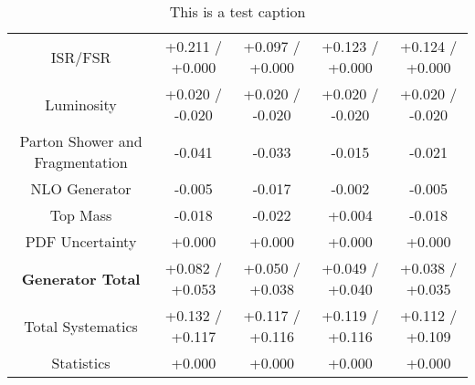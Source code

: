 \begin{table}[htbp]
\begin{center}
\begin{tabular}{|c|c|c|c|c|}
ISR/FSR                               &+0.211   / +0.000   & +0.097   / +0.000   & +0.123   / +0.000   & +0.124   / +0.000  \\
Luminosity                            &+0.020   / -0.020   & +0.020   / -0.020   & +0.020   / -0.020   & +0.020   / -0.020  \\
Parton Shower and Fragmentation       &-0.041              & -0.033              & -0.015              & -0.021             \\
NLO Generator                         &-0.005              & -0.017              & -0.002              & -0.005             \\
Top Mass                              &-0.018              & -0.022              & +0.004              & -0.018             \\
PDF Uncertainty                       &+0.000              & +0.000              & +0.000              & +0.000             \\
\hline
\textbf{Generator Total}              &+0.082   / +0.053   & +0.050   / +0.038   & +0.049   / +0.040   & +0.038   / +0.035  \\
\hline
\hline
Total Systematics                     &+0.132   / +0.117   & +0.117   / +0.116   & +0.119   / +0.116   & +0.112   / +0.109  \\
Statistics                            &+0.000              & +0.000              & +0.000              & +0.000             \\
\hline
  \end{tabular}
  \end{center} 
  \label{tab:xsec_nominal_rratio_low}
  \caption{This is a test caption}
\end{table}


\clearpage



